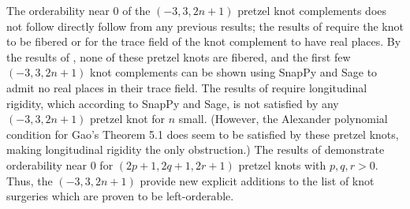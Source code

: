 \documentclass{article}
\theoremstyle{plain}
\theoremstyle{definition}
\theoremstyle{plain}
\theoremstyle{plain}
\theoremstyle{plain}
\theoremstyle{remark}
\newtheorem{remark}[theorem]{Remark}
\theoremstyle{remark}
\newtheorem{example}[theorem]{Example}
\theoremstyle{plain}
\newtheorem{conjecture}[theorem]{Conjecture}
\theoremstyle{plain}
\begin{document}
The orderability near 0 of the $(-3, 3, 2n+1)$ pretzel knot complements does not follow directly follow from any previous results; the results of \cite{cullerdunfield} require the knot to be fibered or for the trace field of the knot complement to have real places. By the results of \cite{sekino}, none of these pretzel knots are fibered, and the first few $(-3, 3, 2n+1)$ knot complements can be shown using SnapPy and Sage to admit no real places in their trace field. The results of \cite{gao} require longitudinal rigidity, which according to SnapPy and Sage, is not satisfied by any $(-3, 3, 2n+1)$ pretzel knot for $n$ small. (However, the Alexander polynomial condition for Gao's Theorem 5.1 does seem to be satisfied by these pretzel knots, making longitudinal rigidity the only obstruction.) The results of \cite{khantran} demonstrate orderability near 0 for $(2p+1, 2q+1, 2r+1)$ pretzel knots with $p, q, r > 0$. Thus, the $(-3, 3, 2n+1)$ provide new explicit additions to the list of knot surgeries which are proven to be left-orderable. 

%

%
%
%
\end{document}
